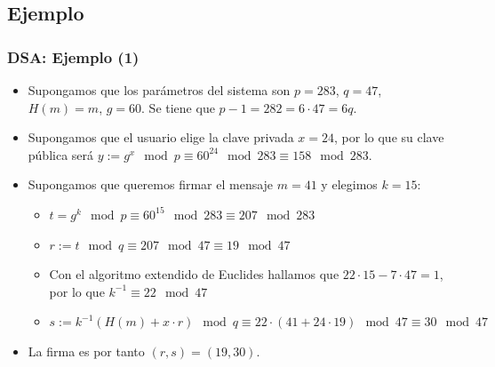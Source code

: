 \documentclass{beamer}
\begin{document}
\subsection{Ejemplo}

\begin{frame}
    \frametitle{DSA: Ejemplo (1)}

    \begin{itemize}
        \item Supongamos que los parámetros del sistema son $p = 283$, $q = 47$, $H(m) = m$, $g = 60$. Se tiene que $p-1 = 282 = 6 \cdot 47 = 6q$.
        \item Supongamos que el usuario elige la clave privada $x = 24$, por lo que su clave pública será $y := g^x \mod p \equiv 60^{24}  \mod 283 \equiv 158 \mod 283$.
        \item Supongamos que queremos firmar el mensaje $m = 41$ y elegimos $k=15$:
        \begin{itemize}
            \item $t = g^k \mod p \equiv 60^{15} \mod 283 \equiv 207 \mod 283$
            \item $r := t \mod q \equiv 207 \mod 47 \equiv 19 \mod 47$
            \item Con el algoritmo extendido de Euclides hallamos que $22 \cdot 15 -7 \cdot 47 = 1$, por lo que $k^{-1} \equiv 22 \mod 47$
            \item $s :=  k^{-1} \left( H(m) + x \cdot r  \right) \mod q \equiv 22 \cdot \left( 41 + 24 \cdot 19  \right) \mod 47 \equiv 30 \mod 47 $
        \end{itemize}

        \item La firma es por tanto $(r, s) = (19, 30)$.
    \end{itemize}    
\end{frame}
\end{document}
